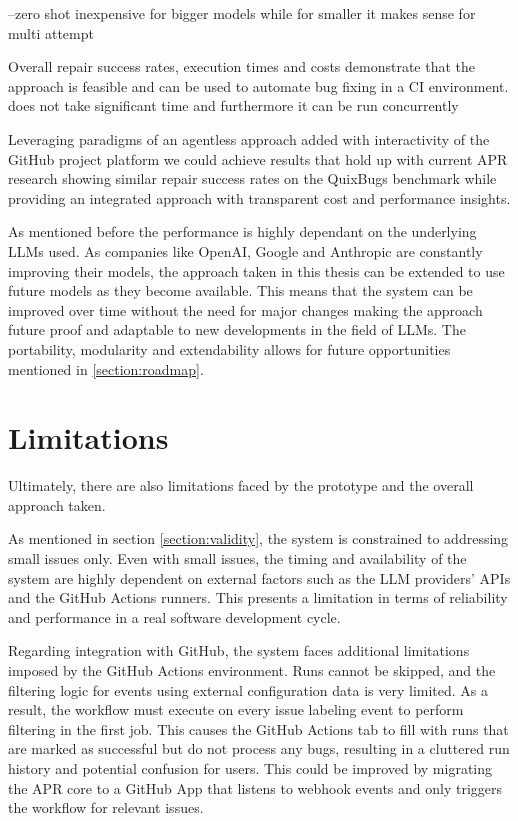 --zero shot inexpensive for bigger models while for smaller it makes sense for multi attempt

Overall repair success rates, execution times and costs demonstrate that the approach is feasible and can be used to automate bug fixing in a CI environment.
does not take significant time and furthermore it can be run concurrently

Leveraging paradigms of an agentless approach added with interactivity of the GitHub project platform we could achieve results that hold up with current APR research \cite{huCanGPTO1Kill2024, } showing similar repair success rates on the QuixBugs benchmark while providing an integrated approach with transparent cost and performance insights.

As mentioned before the performance is highly dependant on the underlying LLMs used. As companies like OpenAI, Google and Anthropic are constantly improving their models, the approach taken in this thesis can be extended to use future models as they become available. This means that the system can be improved over time without the need for major changes making the approach future proof and adaptable to new developments in the field of LLMs. The portability, modularity and extendability allows for future opportunities mentioned in \ref{section:roadmap}.

\section{Limitations}
Ultimately, there are also limitations faced by the prototype and the overall approach taken.

As mentioned in section \ref{section:validity}, the system is constrained to addressing small issues only. Even with small issues, the timing and availability of the system are highly dependent on external factors such as the LLM providers' APIs and the GitHub Actions runners. This presents a limitation in terms of reliability and performance in a real software development cycle.

Regarding integration with GitHub, the system faces additional limitations imposed by the GitHub Actions environment. Runs cannot be skipped, and the filtering logic for events using external configuration data is very limited. As a result, the workflow must execute on every issue labeling event to perform filtering in the first job. This causes the GitHub Actions tab to fill with runs that are marked as successful but do not process any bugs, resulting in a cluttered run history and potential confusion for users. This could be improved by migrating the APR core to a GitHub App that listens to webhook events and only triggers the workflow for relevant issues.

